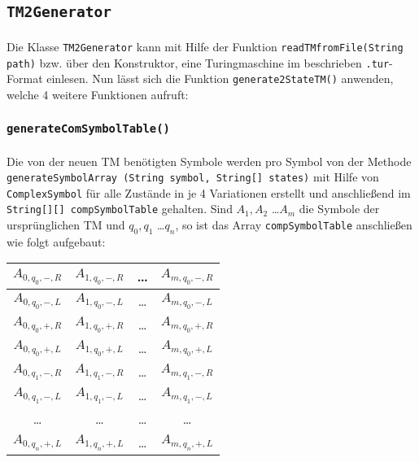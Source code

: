 \documentclass[10pt, a4paper]{article}
\newcommand{\ilc}{\texttt}
\begin{document}
\subsection*{\ilc{TM2Generator}}
\paragraph{}
Die Klasse \ilc{TM2Generator} kann mit Hilfe der Funktion \ilc{readTMfromFile(String path)} bzw. über den Konstruktor, eine Turingmaschine im beschrieben \ilc{.tur}-Format einlesen. Nun lässt sich die Funktion \ilc{generate2StateTM()} anwenden, welche 4 weitere Funktionen aufruft:\par
\subsubsection*{\ilc{generateComSymbolTable()}}
\paragraph*{}
Die von der neuen TM benötigten Symbole werden pro Symbol von der Methode \ilc{generateSymbolArray (String symbol, String[] states)} mit Hilfe von \ilc{ComplexSymbol} für alle Zustände in je 4 Variationen erstellt und anschließend im \ilc{String[][] compSymbolTable} gehalten. Sind $A_1,A_2$ \dots $A_m$ die Symbole der ursprünglichen TM und $q_0, q_1$ \dots $q_n$, so ist das Array \ilc{compSymbolTable} anschließen wie folgt aufgebaut:

\begin{center}
\begin{tabular}{c|c||c||c}
$A_{0,q_0,-,R}$ & $A_{1,q_0,-,R}$ & \dots & $A_{m,q_0,-,R}$\\
\hline
$A_{0,q_0,-,L}$ & $A_{1,q_0,-,L}$ & \dots & $A_{m,q_0,-,L}$\\
\hline
$A_{0,q_0,+,R}$ & $A_{1,q_0,+,R}$ & \dots & $A_{m,q_0,+,R}$\\
\hline
$A_{0,q_0,+,L}$ & $A_{1,q_0,+,L}$ & \dots & $A_{m,q_0,+,L}$\\
\hline
$A_{0,q_1,-,R}$ & $A_{1,q_1,-,R}$ & \dots & $A_{m,q_1,-,R}$\\
\hline
$A_{0,q_1,-,L}$ & $A_{1,q_1,-,L}$ & \dots & $A_{m,q_1,-,L}$\\
\hline
\hline
\dots & \dots & \dots & \dots \\
\hline
\hline
$A_{0,q_n,+,L}$ & $A_{1,q_n,+,L}$ & \dots & $A_{m,q_n,+,L}$\\
\end{tabular}
\end{center}
\par
\end{document}
